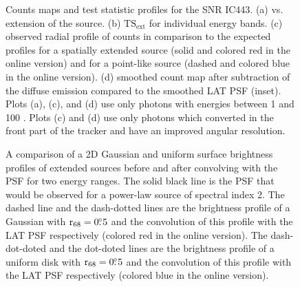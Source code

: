 \documentclass[12pt,preprint]{aastex}
\newif\ifcolorfigure
\newcommand{\gev}{\text{GeV}\xspace}
\newcommand{\tsext}{{\ensuremath{\text{TS}_{\text{ext}}}}\xspace}
\newcommand{\rsixeight}{{\ensuremath{\text{r}_{68}}}\xspace}
\newcommand{\ts}{\text{TS}\xspace}
\begin{document}
\clearpage
\begin{figure}
    \ifcolorfigure
    \plotone{ic443_plots/four_plots_ic443_color.eps}
    \else
    \fi
    \caption{
    Counts maps and test statistic profiles for the SNR IC443. (a) \ts
    vs. extension of the source. (b) \tsext for individual energy
    bands. (c) observed radial profile of counts in comparison to the
    expected profiles for a spatially extended source (solid and colored
    red in the online version) and for a point-like source (dashed and colored
    blue in the online version).  (d) smoothed count map after subtraction
    of the diffuse emission compared to the smoothed
    LAT PSF (inset).  Plots (a),
    (c), and (d) use only 
    photons with energies between
    1 \gev and 100 \gev.  Plots (c) and (d) use
    only photons which converted in the front part of the tracker and
    have an improved angular resolution.
    }
    \label{four_plots_ic443}
\end{figure}

\clearpage
\begin{figure}
    \ifcolorfigure
      \plotone{mc_plots/compare_disk_gauss_color.eps}
    \else
    \fi
    \caption{
    A comparison of a 2D Gaussian and uniform surface brightness profiles
    of extended sources before and after convolving with the PSF for two
    energy ranges.  The solid black line is the PSF that would be observed
    for a power-law source of spectral index 2. The dashed line
    and the dash-dotted lines are 
    the brightness profile of a Gaussian with $\rsixeight=0\fdg5$
    and the convolution of this profile with the LAT PSF respectively
    (colored red in the online version).
    The dash-dot-doted and the dot-doted lines are the brightness profile
    of a uniform disk with $\rsixeight=0\fdg5$ and the convolution
    of this profile with the LAT PSF respectively (colored blue in the online version).
    }\label{compare_disk_gauss}
  \end{figure}
\end{document}
